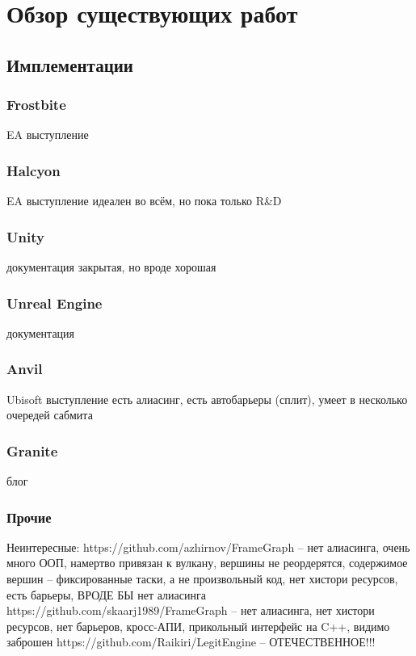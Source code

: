 \section{Обзор существующих работ}
\subsection{Имплементации}

\subsubsection*{Frostbite}
EA выступление\cite{FrostbiteGdcTalk}

\subsubsection*{Halcyon}
EA выступление\cite{HalcyonRapidInnovationTalk}
идеален во всём, но пока только R\&D

\subsubsection*{Unity}
документация\cite{UnityRenderGraph}
закрытая, но вроде хорошая

\subsubsection*{Unreal Engine}
документация\cite{UERenderDependencyGraph}

\subsubsection*{Anvil}
Ubisoft выступление\cite{DX12CaseStudies}
есть алиасинг, есть автобарьеры (сплит), умеет в несколько очередей сабмита

\subsubsection*{Granite}
блог\cite{GraniteBlogPost}

\subsubsection*{Прочие}
Неинтересные:
https://github.com/azhirnov/FrameGraph -- нет алиасинга, очень много ООП, намертво привязан к вулкану, вершины не реордерятся, содержимое вершин -- фиксированные таски, а не произвольный код, нет хистори ресурсов, есть барьеры, ВРОДЕ БЫ нет алиасинга
https://github.com/skaarj1989/FrameGraph -- нет алиасинга, нет хистори ресурсов, нет барьеров, кросс-АПИ, прикольный интерфейс на C++, видимо заброшен
https://github.com/Raikiri/LegitEngine -- ОТЕЧЕСТВЕННОЕ!!!

